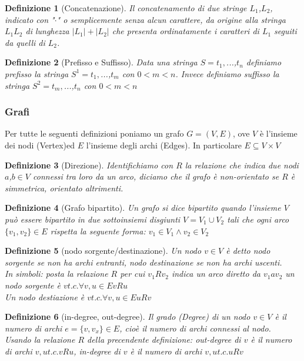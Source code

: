 \documentclass[a4paper]{article}
\newtheorem*{definition}{Definizione}
\begin{document}
\begin{definition}[Concatenazione] Il concatenamento di due stringe $L_1$,$L_2$, indicato con "$\cdot$" o semplicemente senza alcun carattere, da origine alla stringa $L_1L_2$ di lunghezza $|L_1| + |L_2|$ che presenta ordinatamente i caratteri di $L_1$ seguiti da quelli di $L_2$.
\end{definition}

\begin{definition}[Prefisso e Suffisso]Data una stringa $S = t_1,$...,$t_n$ definiamo prefisso la stringa $S^1 = t_1,$...,$t_m$ con $ 0 < m < n$. Invece definiamo suffisso la stringa $S^2 = t_m,$...,$t_n$ con $ 0 < m < n$ 
\end{definition}


\subsubsection{Grafi}

Per tutte le seguenti definizioni poniamo un grafo $G =(V, E)$, ove $V$ è l'insieme dei nodi (Vertex)ed $E$ l'insieme degli archi (Edges). In particolare $E \subseteq V\times V$  
\begin{definition}[Direzione]Identifichiamo con $R$ la relazione che indica due nodi $a$,$b$$\in V$ connessi tra loro da un arco, diciamo che il grafo è non-orientato se $R$ è simmetrica, orientato altrimenti.
\end{definition}

\begin{definition}[Grafo bipartito]Un grafo si dice bipartito quando l'insieme $V$ può essere bipartito in due sottoinsiemi disgiunti $V=V_1\cup V_2$ tali che ogni arco $\{v_1,v_2\} \in E$ rispetta la seguente forma: $v_1 \in V_1 \land v_2 \in V_2$
\end{definition}

\begin{definition}[nodo sorgente/destinazione]Un nodo $v \in V$ è detto nodo sorgente se non ha archi entranti, nodo destinazione se non ha archi uscenti.\\
In simboli: posta la relazione $R$ per cui $v_1Rv_2$ indica un arco diretto da $v_1 a v_2$ un nodo sorgente è $v t.c. \forall {v,u} \in E vRu$\\
Un nodo destiazione è $v t.c. \forall {v,u} \in E uRv$
\end{definition}

\begin{definition}[in-degree, out-degree]Il grado (Degree) di un nodo $v \in V$ è il numero di archi $e = \{v,v_x\}\in E$, cioè il numero di archi connessi al nodo.\\
Usando la relazione $R$ della precendente definizione: out-degree di $v$ è il numero di archi ${v,u} t.c. vRu$, in-degree di $v$ è il numero di archi ${v,u} t.c. uRv$
\end{definition}
\end{document}
